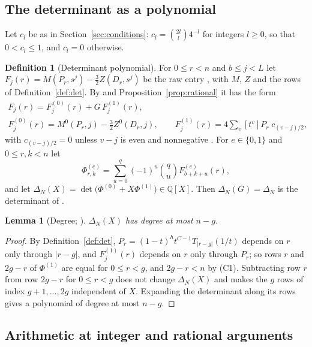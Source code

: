 \documentclass[11pt]{article}
\newtheorem{lemma}[theorem]{Lemma}
\theoremstyle{definition}
\newtheorem{definition}[theorem]{Definition}
\begin{document}
\subsection{The determinant as a polynomial}\label{xsec:poly}

Let $c_l$ be as in Section~\ref{sec:conditions}: $c_l=\binom{2l}{l}4^{-l}$ for integers $l\ge0$, so that $0<c_l\le1$, and $c_l=0$ otherwise.

\begin{definition}[Determinant polynomial]\label{xdef:poly}
For $0\le r<n$ and $b\le j<L$ let $F_j(r)=M(P_r,s^j)-\frac32Z(D_r,s^j)$ be the raw entry \cite[Sec.~2]{OAI}, with $M$, $Z$ and the rows of Definition~\ref{def:det}. By \cite[Prop.~2.1]{OAI} and Proposition~\ref{prop:rational} it has the form
\begin{gather*}
F_j(r)=F^{(0)}_j(r)+G\,F^{(1)}_j(r),\\
F^{(0)}_j(r)=M^0(P_r,j)-\tfrac32Z^0(D_r,j),\qquad F^{(1)}_j(r)=4\sum_{v}[t^v]P_r\;c_{(v-j)/2},
\end{gather*}
with $c_{(v-j)/2}=0$ unless $v-j$ is even and nonnegative \cite[Sec.~4.3]{OAI}. For $e\in\{0,1\}$ and $0\le r,k<n$ let
\[
\Phi^{(e)}_{r,k}=\sum_{u=0}^{q}(-1)^u\binom qu F^{(e)}_{b+k+u}(r),
\]
and let $\Delta_N(X)=\det\big(\Phi^{(0)}+X\Phi^{(1)}\big)\in\mathbb Q[X]$. Then $\Delta_N(G)=\Delta_N$ is the determinant of \cite[Eq.~(7)]{OAI}.
\end{definition}

\begin{lemma}[Degree; {\cite[Lemma~3.1]{Litsey}}]\label{xlem:degree}
$\Delta_N(X)$ has degree at most $n-g$.
\end{lemma}

\begin{proof}
By Definition~\ref{def:det}, $P_r=(1-t)^ht^{C-1}T_{|r-g|}(1/t)$ depends on $r$ only through $|r-g|$, and $F^{(1)}_j(r)$ depends on $r$ only through $P_r$; so rows $r$ and $2g-r$ of $\Phi^{(1)}$ are equal for $0\le r<g$, and $2g-r<n$ by (C1). Subtracting row $r$ from row $2g-r$ for $0\le r<g$ does not change $\Delta_N(X)$ and makes the $g$ rows of index $g+1,\dots,2g$ independent of $X$. Expanding the determinant along its rows gives a polynomial of degree at most $n-g$.
\end{proof}

\subsection{Arithmetic at integer and rational arguments}\label{xsec:arith}
\end{document}

